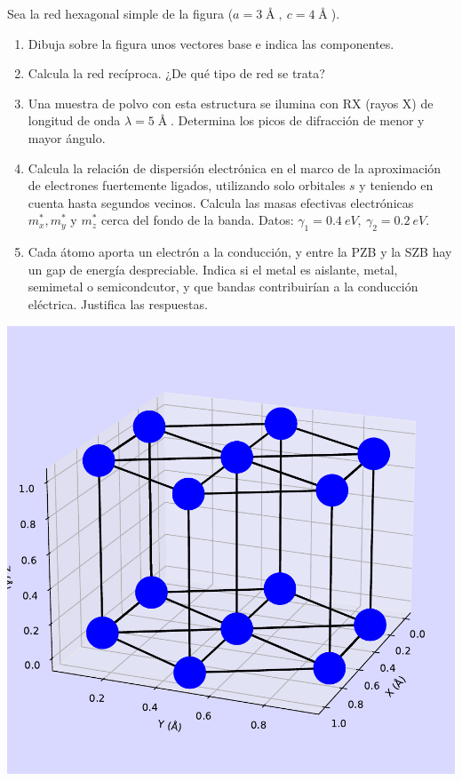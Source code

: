 \begin{ejercicio}
	Sea la red hexagonal simple de la figura ($a=3 \unit{\Angstrom},\ c=4 \unit{\Angstrom}$). 
	\begin{enumerate}[label=\alph*)]
		\item Dibuja sobre la figura unos vectores base e indica las componentes.
		\item Calcula la red recíproca. ¿De qué tipo de red se trata?
		\item Una muestra de polvo con esta estructura se ilumina con RX (rayos X) de longitud de onda $\lambda = 5 \unit{\Angstrom}$. Determina los picos de difracción de menor y mayor ángulo.
		\item Calcula la relación de dispersión electrónica en el marco de la aproximación de electrones fuertemente ligados, utilizando solo orbitales $s$ y teniendo en cuenta hasta segundos vecinos. Calcula las masas efectivas electrónicas $m_x^*,m_y^*$ y $m_z^*$ cerca del fondo de la banda. Datos: $\gamma_1 = 0.4 \ \unit{eV}, \ \gamma_2 = 0.2 \ \unit{eV}$.
		\item Cada átomo aporta un electrón a la conducción, y entre la PZB y la SZB hay un gap de energía despreciable. Indica si el metal es aislante, metal, semimetal o semicondcutor, y que bandas contribuirían a la conducción eléctrica. Justifica las respuestas.
	\end{enumerate}
	\begin{center}
	\includegraphics[scale=0.5]{Imagenes/2023-Enero-02.pdf}
	\end{center}
\end{ejercicio}	


